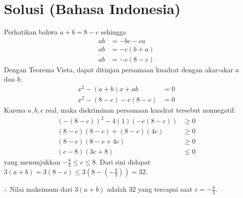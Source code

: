 \section{Solusi (Bahasa Indonesia)}
Perhatikan bahwa $a+b = 8-c$ sehingga
\begin{align*}
    ab &= -bc-ca\\
    ab &= -c(b+a)\\
    ab &= -c(8-c)
\end{align*}
Dengan Teorema Vieta, dapat ditinjau persamaan kuadrat dengan akar-akar $a$ dan $b$:
\begin{align*}
    x^2 - (a+b)x + ab &= 0\\
    x^2 - (8-c) - c(8-c) &= 0
\end{align*}
Karena $a,b,c$ real, maka diskriminan persamaan kuadrat tersebut nonnegatif:
\begin{align*}
    (-(8-c))^2 - 4(1)(-c(8-c)) &\ge 0\\
    (8-c)(8-c) + (8-c)(4c) &\ge 0\\
    (8-c)(8-c+4c) &\ge 0\\
    (c-8)(3c+8) &\le 0
\end{align*}
yang menunjukkan $-\frac{8}{3} \le c \le 8$.
Dari sini didapat $3(a+b) = 3(8-c) \le 3(8-(-\frac{8}{3})) = 32$.

$\therefore$ Nilai maksimum dari $3(a + b)$ adalah 32 yang tercapai saat $c=-\frac{8}{3}$.

